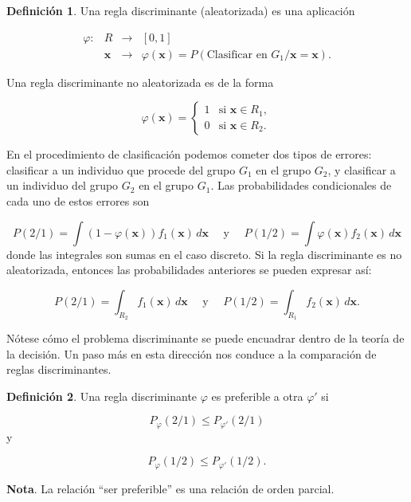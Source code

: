 \documentclass[
  a4paper,
  oneside]{scrbook}
\theoremstyle{definition}
\newtheorem{definition}{Definición}[chapter]
\theoremstyle{definition}
\theoremstyle{definition}
\theoremstyle{definition}
\theoremstyle{remark}
\begin{document}
\begin{definition}
\protect\hypertarget{def:unnamed-chunk-90}{}\label{def:unnamed-chunk-90}Una regla discriminante (aleatorizada) es una aplicación

\[\begin{array}{rccl}
\varphi : & R & \longrightarrow & [0,1] \\
          & \bm{x} & \longrightarrow & \varphi(\bm{x})=P(\mbox{Clasificar en }G_1/\bm{x}=\bm{x}).
\end{array}\]

Una regla discriminante no aleatorizada es de la forma

\[\varphi(\bm{x})=\left\{\begin{array}{ll}
1 & \mbox{si } \bm{x}\in R_1, \\
0 & \mbox{si } \bm{x}\in R_2. \end{array}\right.\]
\end{definition}

En el procedimiento de clasificación podemos cometer dos tipos de
errores: clasificar a un individuo que procede del grupo \(G_1\) en el
grupo \(G_2\), y clasificar a un individuo del grupo \(G_2\) en el grupo
\(G_1\). Las probabilidades condicionales de cada uno de estos errores
son

\[P(2/1)=\int \left(1-\varphi(\bm{x})\right)f_1(\bm{x})\,d\bm{x}\ \ \ \ \ \ \mbox{y}
\ \ \ \ \ \ P(1/2)=\int \varphi(\bm{x}) f_2(\bm{x})\,d\bm{x}\] donde las
integrales son sumas en el caso discreto. Si la regla discriminante es
no aleatorizada, entonces las probabilidades anteriores se pueden
expresar así:

\[P(2/1)=\int_{R_2} f_1(\bm{x})\,d\bm{x}\ \ \ \ \ \ \mbox{y}
\ \ \ \ \ \ P(1/2)=\int_{R_1} f_2(\bm{x})\,d\bm{x}.\]

Nótese cómo el problema discriminante se puede encuadrar dentro de la
teoría de la decisión. Un paso más en esta dirección nos conduce a la
comparación de reglas discriminantes.

\begin{definition}
\protect\hypertarget{def:unnamed-chunk-91}{}\label{def:unnamed-chunk-91}Una regla discriminante \(\varphi\) es preferible a otra \(\varphi'\) si

\[P_{\varphi}(2/1)\leq P_{\varphi'}(2/1)\] y

\[P_{\varphi}(1/2)\leq P_{\varphi'}(1/2).\]
\end{definition}

\textbf{Nota}. La relación ``ser preferible'' es una relación de orden parcial.
\end{document}
